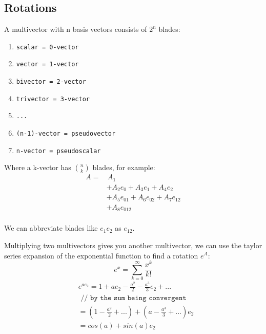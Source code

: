 \documentclass[twoside]{article}
\newcommand{\F}[2]{\frac{#1}{#2}} %
\newcommand{\aside}[1]{\begin{flushright}\scriptsize{#1}\end{flushright}}
\begin{document}
\begin{multicols*}{2}
        \section{Rotations}
            \par
                A multivector with n basis vectors consists of $ 2^n $ blades:
                \begin{enumerate}[-]
                    \item \texttt{scalar = 0-vector}
                    \item \texttt{vector = 1-vector}
                    \item \texttt{bivector = 2-vector}
                    \item \texttt{trivector = 3-vector}
                    \item \texttt{...}
                    \item \texttt{(n-1)-vector = pseudovector}
                    \item \texttt{n-vector = pseudoscalar}
                \end{enumerate} \vspace{5px}
                Where a k-vector has $n \choose k$ blades, for example:
                $$\begin{aligned}
                    A = & \, A_1 \\
                    &+ A_2 e_0 + A_3 e_1 + A_4 e_2 \\
                    &+ A_5 e_{01} + A_6 e_{02} + A_7 e_{12} \\
                    &+ A_8 e_{012} \\
                \end{aligned}$$
                \aside{We can abbreviate blades like $ e_1 e_2 $ as $ e_{12} $.}
            \par
                Multiplying two multivectors gives you another multivector,
                we can use the taylor series expansion of the exponential function
                to find a rotation $e^A$:
                $$ e^x = \sum_{k=0}^\infty \F{x^k}{k!} $$
                $$\begin{aligned}
                    &e^{a e_2} = 1 + a e_2 - \F{a^2}{2} - \F{a^3}{3} e_2 + ... \\
                    &\texttt{ // by the sum being convergent} \\
                    &= (1 - \F{a^2}{2} + ...) + (a - \F{a^3}{3} + ...) e_2 \\
                    &= cos(a) + sin(a) e_2 \\

\end{aligned}$$
\end{multicols*}
\end{document}

